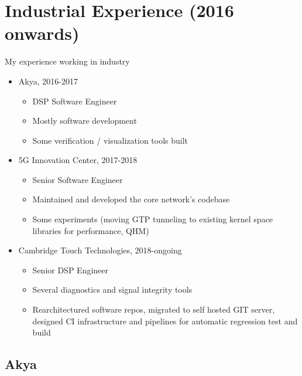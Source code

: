 \documentclass{if-beamer}
\begin{document}
\section{Industrial Experience (2016 onwards)}
\begin{frame}
My experience working in industry
\begin{itemize}
\item Akya, 2016-2017
\begin{itemize}
\item DSP Software Engineer
\item Mostly software development
\item Some verification / visualization tools built 
\end{itemize}
\item 5G Innovation Center, 2017-2018
\begin{itemize}
\item Senior Software Engineer
\item Maintained and developed the core network's codebase
\item Some experiments (moving GTP tunneling to existing kernel space libraries for performance, QHM)
\end{itemize}
\item Cambridge Touch Technologies, 2018-ongoing
\begin{itemize}
\item Senior DSP Engineer
\item Several diagnostics and signal integrity tools
\item Rearchitectured software repos, migrated to self hosted GIT server, designed CI infrastructure and pipelines for automatic regression test and build
\end{itemize}
\end{itemize}
\end{frame}
\subsection{Akya}
\iffalse
\begin{frame}
AKYA's core business was a novel ``dynamically reconfigurable logic'' approach to hardware design, for low power/low cost applications, unlike e.g. FPGA, providing ``just enough'' reconfigurability to meet design requirements. 
At AKYA I contributed as a software engineer to the codebase of a framework to synthesise logic from a high-level description of the hardware. My role was to design and develop algorithms and software components that expand and integrate the existing framework, as well as creating tools for testing and data visualization
\end{frame}
\fi
\end{document}
